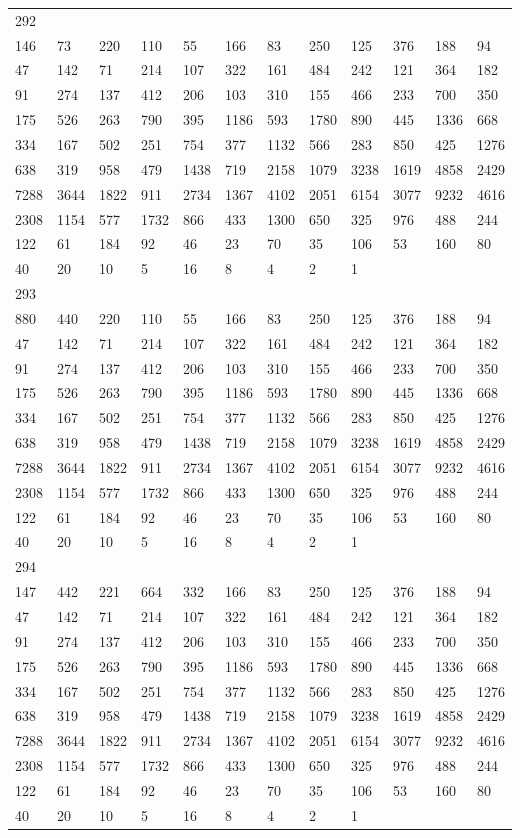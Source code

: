 \begin{longtable}{llllllllllll}
292&&&&&&&&&&&\\
146& 73& 220& 110& 55& 166& 83& 250& 125& 376& 188& 94\\
47& 142& 71& 214& 107& 322& 161& 484& 242& 121& 364& 182\\
91& 274& 137& 412& 206& 103& 310& 155& 466& 233& 700& 350\\
175& 526& 263& 790& 395& 1186& 593& 1780& 890& 445& 1336& 668\\
334& 167& 502& 251& 754& 377& 1132& 566& 283& 850& 425& 1276\\
638& 319& 958& 479& 1438& 719& 2158& 1079& 3238& 1619& 4858& 2429\\
7288& 3644& 1822& 911& 2734& 1367& 4102& 2051& 6154& 3077& 9232& 4616\\
2308& 1154& 577& 1732& 866& 433& 1300& 650& 325& 976& 488& 244\\
122& 61& 184& 92& 46& 23& 70& 35& 106& 53& 160& 80\\
40& 20& 10& 5& 16& 8& 4& 2& 1& \\

293&&&&&&&&&&&\\
880& 440& 220& 110& 55& 166& 83& 250& 125& 376& 188& 94\\
47& 142& 71& 214& 107& 322& 161& 484& 242& 121& 364& 182\\
91& 274& 137& 412& 206& 103& 310& 155& 466& 233& 700& 350\\
175& 526& 263& 790& 395& 1186& 593& 1780& 890& 445& 1336& 668\\
334& 167& 502& 251& 754& 377& 1132& 566& 283& 850& 425& 1276\\
638& 319& 958& 479& 1438& 719& 2158& 1079& 3238& 1619& 4858& 2429\\
7288& 3644& 1822& 911& 2734& 1367& 4102& 2051& 6154& 3077& 9232& 4616\\
2308& 1154& 577& 1732& 866& 433& 1300& 650& 325& 976& 488& 244\\
122& 61& 184& 92& 46& 23& 70& 35& 106& 53& 160& 80\\
40& 20& 10& 5& 16& 8& 4& 2& 1& \\

294&&&&&&&&&&&\\
147& 442& 221& 664& 332& 166& 83& 250& 125& 376& 188& 94\\
47& 142& 71& 214& 107& 322& 161& 484& 242& 121& 364& 182\\
91& 274& 137& 412& 206& 103& 310& 155& 466& 233& 700& 350\\
175& 526& 263& 790& 395& 1186& 593& 1780& 890& 445& 1336& 668\\
334& 167& 502& 251& 754& 377& 1132& 566& 283& 850& 425& 1276\\
638& 319& 958& 479& 1438& 719& 2158& 1079& 3238& 1619& 4858& 2429\\
7288& 3644& 1822& 911& 2734& 1367& 4102& 2051& 6154& 3077& 9232& 4616\\
2308& 1154& 577& 1732& 866& 433& 1300& 650& 325& 976& 488& 244\\
122& 61& 184& 92& 46& 23& 70& 35& 106& 53& 160& 80\\
40& 20& 10& 5& 16& 8& 4& 2& 1& \\


\end{longtable}
